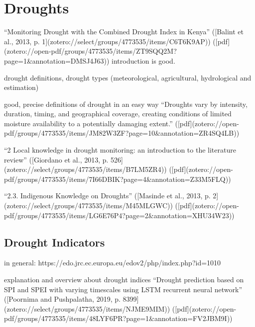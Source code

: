 \section{Droughts}
“Monitoring Drought with the Combined Drought Index in Kenya” ([Balint et al., 2013, p. 1](zotero://select/groups/4773535/items/C6T6K9AP)) ([pdf](zotero://open-pdf/groups/4773535/items/ZT9SQQ2M?page=1\&annotation=DMSJ4J63))
introduction is good.

drought definitions, drought types (meteorological, agricultural, hydrological and estimation)

good, precise definitions of drought in an easy way
“Droughts vary by intensity, duration, timing, and geographical coverage, creating conditions of limited moisture availability to a potentially damaging extent.” ([pdf](zotero://open-pdf/groups/4773535/items/JM82W3ZF?page=10&annotation=ZR4SQ4LB))


“2 Local knowledge in drought monitoring: an introduction to the literature review” ([Giordano et al., 2013, p. 526](zotero://select/groups/4773535/items/B7LM5ZR4)) ([pdf](zotero://open-pdf/groups/4773535/items/7I66DBIK?page=4&annotation=Z33M5FLQ))

“2.3. Indigenous Knowledge on Droughts” ([Masinde et al., 2013, p. 2](zotero://select/groups/4773535/items/M45MLGWC)) ([pdf](zotero://open-pdf/groups/4773535/items/LG6E76P4?page=2&annotation=XHU34W23))


\subsection{Drought Indicators}

in general: https://edo.jrc.ec.europa.eu/edov2/php/index.php?id=1010

explanation and overview about drought indices “Drought prediction based on SPI and SPEI with varying timescales using LSTM recurrent neural network” ([Poornima and Pushpalatha, 2019, p. 8399](zotero://select/groups/4773535/items/NJME9MIM)) ([pdf](zotero://open-pdf/groups/4773535/items/48LYF6PR?page=1&annotation=FV2JBM9I))

